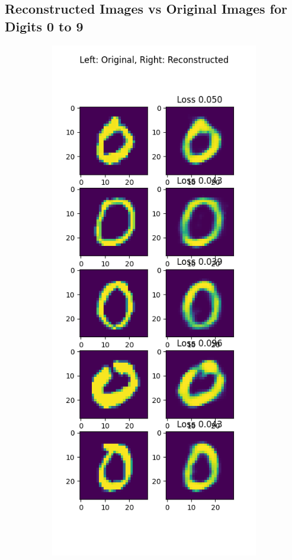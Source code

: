 \begin{solve}
\subsection{Reconstructed Images vs Original Images for Digits 0 to 9}
\begin{figure}[H]
\centering

\begin{subfigure}{.5\textwidth}
  \centering
  \includegraphics[width=.9\linewidth]{plots/output_0.png}

\end{subfigure}
\end{figure}
\end{solve}
